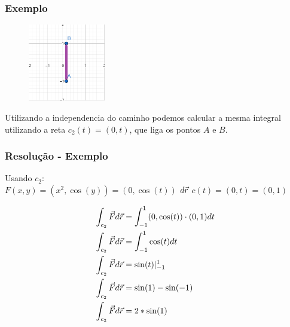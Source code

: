 \documentclass{beamer}
\def\vec{\mathaccent "017E\relax }
\begin{document}
\begin{frame}
    \frametitle{Exemplo} 

    \begin{figure} %
        \vspace{-35pt}
        \centering
        \caption{}
        \includegraphics[width=0.30\textwidth]{grafico-exemplo-2.png}
        \label{fig:grafico-exemplo1}
    \end{figure}

    Utilizando a independencia do caminho podemos calcular a mesma integral utilizando 
    a reta $ c_2(t) = ( 0, t) $, que liga os pontos $ A $ e $ B $.

\end{frame}

\begin{frame}
    \frametitle{Resolução - Exemplo} 
    Usando $ c_2 $: \\
    
    $ F(x, y) = ( x^2, \cos(y) ) = ( 0, \cos(t) ) $
    \hfill \break
    $ d\vec{r} $
    \hfill \break
    $ c(t) = ( 0, t ) = ( 0, 1 ) $
    \hfill \break
    
    \begin{align*}   
    \int_{c_2} \vec{F} d\vec{r} &= \int_{-1}^1 (0, \cos(t) ) \cdot ( 0, 1 ) dt \\
    \int_{c_2} \vec{F} d\vec{r} &= \int_{-1}^1 \cos(t) dt  \\
    \int_{c_2} \vec{F} d\vec{r} &= \sin(t)\vert_{-1}^{1} \\
    \int_{c_2} \vec{F} d\vec{r} &= \sin(1) - \sin(-1) \\
    \int_{c_2} \vec{F} d\vec{r} &= 2 * \sin(1) \\
    \end{align*}
    
\end{frame}
\end{document}
